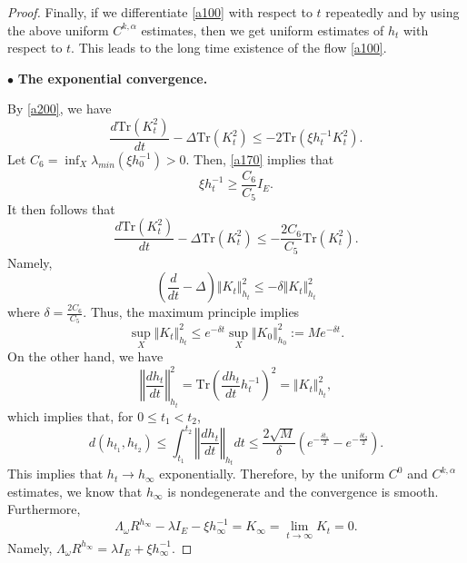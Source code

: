 \documentclass[10pt,a4paper]{amsart}
\newcommand{\ga}{\alpha}
\newcommand{\gd}{\delta}
\newcommand{\lb}{\left (}
\newcommand{\rb}{\right )}
\newcommand{\tr}{\text{Tr}}
\begin{document}
\begin{proof}
Finally, if we differentiate \eqref{a100} with respect to $t$ repeatedly and by using the above uniform $C^{k,\ga}$ estimates, then we get uniform estimates of $h_t$ with respect to $t$. This leads to the long time existence of the flow \eqref{a100}.

\medskip
\noindent $\bullet$\textbf{ The exponential convergence.}

\smallskip
By \eqref{a200}, we have
\[
\frac{d \tr\lb K_t^2\rb}{dt}-\Delta \tr\lb K_t^2\rb\leq -2\tr \lb \xi h_t^{-1}K_t^2\rb.
\]
Let $C_6=\inf_X \lambda_{min}\lb \xi h_0^{-1}\rb>0$. Then, \eqref{a170} implies that
\[\xi h_t^{-1}\geq \frac{C_6}{C_5}I_E.
\]
It then follows that
\[
\frac{d \tr\lb K_t^2\rb}{dt}-\Delta \tr\lb K_t^2\rb\leq -\frac{2C_6}{C_5}\tr\lb K_t^2\rb.
\]
Namely,
\[
\lb \frac{d}{dt}-\Delta\rb \Vert K_t\Vert_{h_t}^2\leq -\gd \Vert K_t\Vert_{h_t}^2
\]
where $\gd=\frac{2C_6}{C_5}$. Thus, the maximum principle implies
\[
\sup_X \Vert K_t\Vert_{h_t}^2\leq e^{-\gd t}\sup_X \Vert K_0\Vert_{h_0}^2:=M e^{-\gd t}.
\]
On the other hand, we have
\[
\left \Vert \frac{dh_t}{dt}\right \Vert_{h_t}^2 =\tr \lb \frac{dh_t}{dt}h_t^{-1}\rb^2=\Vert K_t\Vert_{h_t}^2,
\]
which implies that, for $0\leq t_1<t_2$,
\[
d\lb h_{t_1}, h_{t_2}\rb\leq \int_{t_1}^{t_2} \left \Vert \frac{dh_t}{dt}\right \Vert_{h_t}dt\leq
\frac{2\sqrt M}{\gd}\lb e^{-\frac{\gd t_1}{2}}-e^{-\frac{\gd t_2}{2}}\rb.
\]
This implies that $h_t\to h_\infty$ exponentially. Therefore, by the uniform $C^0$ and $C^{k,\ga}$ estimates,  we know that $h_\infty$ is nondegenerate and the convergence is smooth. Furthermore,
\[
\Lambda_\omega R^{h_\infty}-\lambda I_E-\xi h_{\infty}^{-1}=K_\infty=\lim_{t\to\infty} K_t=0.
\]
Namely, $\Lambda_\omega  R^{h_\infty}=\lambda I_E+\xi h_{\infty}^{-1}$.

\end{proof}
\end{document}
